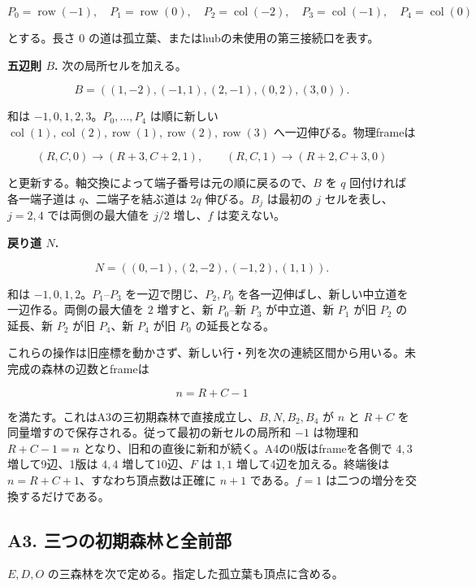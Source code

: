 \documentclass[
  10pt,
  a4paper,
]{article}
\begin{document}
\[
P_0=\operatorname{row}(-1),\quad P_1=\operatorname{row}(0),\quad
P_2=\operatorname{col}(-2),\quad P_3=\operatorname{col}(-1),\quad P_4=\operatorname{col}(0)
\]

とする。長さ \(0\) の道は孤立葉、またはhubの未使用の第三接続口を表す。

\textbf{五辺則 \(B\).} 次の局所セルを加える。

\[
B=((1,-2),(-1,1),(2,-1),(0,2),(3,0)).
\]

和は \(-1,0,1,2,3\)。\(P_0,\ldots,P_4\) は順に新しい
\(\operatorname{col}(1),\operatorname{col}(2),\operatorname{row}(1),\operatorname{row}(2),\operatorname{row}(3)\)
へ一辺伸びる。物理frameは

\[
(R,C,0)\longrightarrow(R+3,C+2,1),\qquad
(R,C,1)\longrightarrow(R+2,C+3,0)
\]

と更新する。軸交換によって端子番号は元の順に戻るので、\(B\) を \(q\)
回付ければ各一端子道は \(q\)、二端子を結ぶ道は \(2q\) 伸びる。\(B_j\)
は最初の \(j\) セルを表し、\(j=2,4\) では両側の最大値を \(j/2\)
増し、\(f\) は変えない。

\textbf{戻り道 \(N\).}

\[
N=((0,-1),(2,-2),(-1,2),(1,1)).
\]

和は \(-1,0,1,2\)。\(P_1\)--\(P_3\) を一辺で閉じ、\(P_2,P_0\)
を各一辺伸ばし、新しい中立道を一辺作る。両側の最大値を \(2\) 増すと、新
\(P_0\)--新 \(P_3\) が中立道、新 \(P_1\) が旧 \(P_2\) の延長、新 \(P_2\)
が旧 \(P_4\)、新 \(P_4\) が旧 \(P_0\) の延長となる。

これらの操作は旧座標を動かさず、新しい行・列を次の連続区間から用いる。未完成の森林の辺数とframeは

\[
n=R+C-1
\]

を満たす。これはA3の三初期森林で直接成立し、\(B,N,B_2,B_4\) が \(n\) と
\(R+C\) を同量増すので保存される。従って最初の新セルの局所和 \(-1\)
は物理和 \(R+C-1=n\)
となり、旧和の直後に新和が続く。A4の0版はframeを各側で \(4,3\)
増して9辺、1版は \(4,4\) 増して10辺、\(F\) は \(1,1\)
増して4辺を加える。終端後は \(n=R+C+1\)、すなわち頂点数は正確に \(n+1\)
である。\(f=1\) は二つの増分を交換するだけである。

\subsection{A3.
三つの初期森林と全前部}\label{a3.-ux4e09ux3064ux306eux521dux671fux68eeux6797ux3068ux5168ux524dux90e8}

\(E,D,O\) の三森林を次で定める。指定した孤立葉も頂点に含める。
\end{document}
